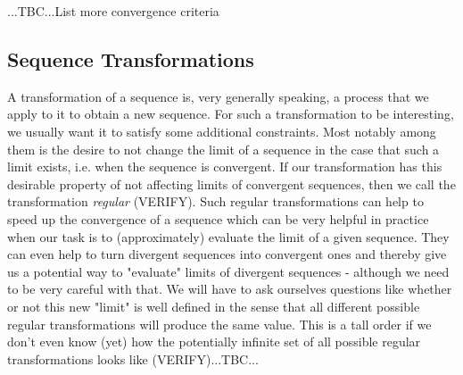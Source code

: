 
...TBC...List more convergence criteria


\subsection{Sequence Transformations}
A transformation of a sequence is, very generally speaking, a process that we apply to it to obtain a new sequence. For such a transformation to be interesting, we usually want it to satisfy some additional constraints. Most notably among them is the desire to not change the limit of a sequence in the case that such a limit exists, i.e. when the sequence is convergent. If our transformation has this desirable property of not affecting limits of convergent sequences, then we call the transformation \emph{regular} (VERIFY). Such regular transformations can help to speed up the convergence of a sequence which can be very helpful in practice when our task is to (approximately) evaluate the limit of a given sequence. They can even help to turn divergent sequences into convergent ones and thereby give us a potential way to "evaluate" limits of divergent sequences - although we need to be very careful with that. We will have to ask ourselves questions like whether or not this new "limit" is well defined in the sense that all different possible regular transformations will produce the same value. This is a tall order if we don't even know (yet) how the potentially infinite set of all possible regular transformations looks like (VERIFY)...TBC...






